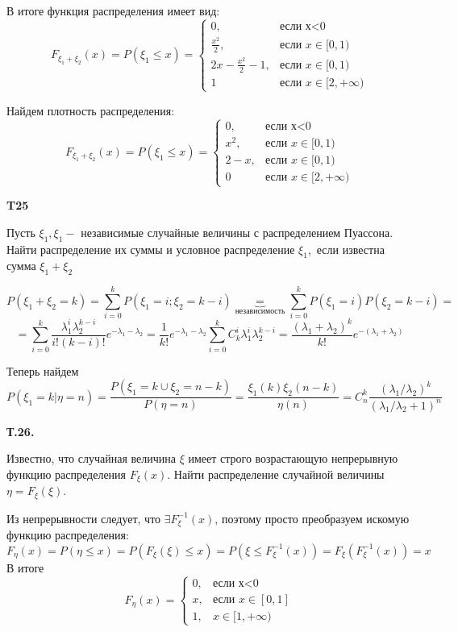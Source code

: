 \documentclass[a4paper,12pt]{article} %
\begin{document}
\begin{example}
В итоге функция распределения имеет вид:
\[ F_{\xi_1+\xi_2}(x)=P(\xi_1 \le x) = 
\begin{cases} 
0,   & \text{если х<0} \\ 
\frac{x^2}{2},  &\text{если }  x\in[0,1) \\
2x-\frac{x^2}{2}-1, &\text{если }  x\in[0,1) \\
1   &\text{если }  x\in[2,+\infty)   
\end{cases}  \]


Найдем плотность распределения:
\[ F_{\xi_1+\xi_2}(x)=P(\xi_1 \le x) = 
\begin{cases} 
0,   & \text{если х<0} \\ 
x^2,  &\text{если }  x\in[0,1) \\
2-x, &\text{если }  x\in[0,1) \\
0  &\text{если }  x\in[2,+\infty)   
\end{cases}  \]



\end{example}


\begin{example}\textbf{T25}

Пусть $\xi_{1}, \xi_{1} -$ независимые случайные величины с распределением Пуассона. 
Найти распределение их суммы и условное распределение $\xi_{1},$ если известна сумма $\xi_{1}+\xi_{2}$


\[ P(\xi_{1}+\xi_{2}=k)=\sum_{i=0}^{k}P(\xi_{1}=i;\xi_2=k-i) \underbrace{=}_{\text{независимость}}
\sum_{i=0}^{k}P(\xi_1=i)P(\xi_2=k-i)= \]
\[ = \sum_{i=0}^{k} \frac{\lambda_1^i \lambda_2^{k-i}}{i! (k-i)!} e^{-\lambda_1-\lambda_2}=
\frac{1}{k!} e^{-\lambda_1-\lambda_2}\sum_{i=0}^{k} C_k^i \lambda_1^i \lambda_2^{k-i}=
\frac{(\lambda_1+\lambda_2)^k}{k!}e^{-(\lambda_1+\lambda_2)}
\]

Теперь найдем 
\[ P(\xi_1=k|\eta =n) =\frac{P(\xi_1=k \cup \xi_2=n-k)}{P(\eta=n)}=
\frac{\xi_1(k)\xi_2(n-k)}{\eta(n)}= C_n^k\frac{(\lambda_1/\lambda_2)^k}{(\lambda_1/\lambda_2+1)^n}\]


\end{example}




\begin{example}\textbf{Т.26.} 

Известно, что случайная величина $\xi$ имеет строго возрастающую непрерывную функцию распределения $F_{\xi}(x) .$ 
Найти распределение случайной величины $\eta=F_{\xi}(\xi) .$


Из непрерывности следует, что $ \exists F^{-1}_\xi (x)$, поэтому просто преобразуем искомую функцию распределения:
\[ F_\eta (x)= 
P(\eta\le x)= P(F_\xi(\xi) \le x) = 
P(\xi\le F^{-1}_\xi (x) )= 
F_\xi(F^{-1}_\xi (x))=x \]
В итоге
\[ F_\eta(x)=
\begin{cases} 
0,   & \text{если х<0} \\ 
x,  & \text{если }  x\in[0,1] \\
1, & x\in[1,+\infty)   
\end{cases}  \]


\end{example}
\end{document}
